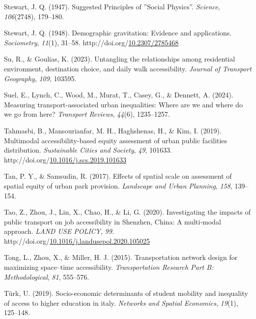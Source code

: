 \documentclass[
11pt, %
oneside, %
english, %
singlespacing, %
]{macthesis} %
\newlength{\cslhangindent}
\newenvironment{CSLReferences}[2] %
{\begin{list}{}{%
	\setlength{\itemindent}{0pt}
	\setlength{\leftmargin}{0pt}
	\setlength{\parsep}{0pt}
	\ifodd #1
	\setlength{\leftmargin}{\cslhangindent}
	\setlength{\itemindent}{-1\cslhangindent}
	\fi
	\setlength{\itemsep}{#2\baselineskip}}}
{\end{list}}
\begin{document}
\begin{CSLReferences}{1}{0}
Stewart, J. Q. (1947). Suggested {Principles} of ''{Social} {Physics}''. \emph{Science}, \emph{106}(2748), 179--180.

Stewart, J. Q. (1948). Demographic gravitation: Evidence and applications. \emph{Sociometry}, \emph{11}(1), 31--58. http://doi.org/\href{https://doi.org/10.2307/2785468}{10.2307/2785468}

Su, R., \& Goulias, K. (2023). Untangling the relationships among residential environment, destination choice, and daily walk accessibility. \emph{Journal of Transport Geography}, \emph{109}, 103595.

Suel, E., Lynch, C., Wood, M., Murat, T., Casey, G., \& Dennett, A. (2024). Measuring transport-associated urban inequalities: Where are we and where do we go from here? \emph{Transport Reviews}, \emph{44}(6), 1235--1257.

Tahmasbi, B., Mansourianfar, M. H., Haghshenas, H., \& Kim, I. (2019). Multimodal accessibility-based equity assessment of urban public facilities distribution. \emph{Sustainable Cities and Society}, \emph{49}, 101633. http://doi.org/\href{https://doi.org/10.1016/j.scs.2019.101633}{10.1016/j.scs.2019.101633}

Tan, P. Y., \& Samsudin, R. (2017). Effects of spatial scale on assessment of spatial equity of urban park provision. \emph{Landscape and Urban Planning}, \emph{158}, 139--154.

Tao, Z., Zhou, J., Lin, X., Chao, H., \& Li, G. (2020). Investigating the impacts of public transport on job accessibility in {Shenzhen}, {China}: A multi-modal approach. \emph{LAND USE POLICY}, \emph{99}. http://doi.org/\href{https://doi.org/10.1016/j.landusepol.2020.105025}{10.1016/j.landusepol.2020.105025}

Tong, L., Zhou, X., \& Miller, H. J. (2015). Transportation network design for maximizing space--time accessibility. \emph{Transportation Research Part B: Methodological}, \emph{81}, 555--576.

Türk, U. (2019). Socio-economic determinants of student mobility and inequality of access to higher education in italy. \emph{Networks and Spatial Economics}, \emph{19}(1), 125--148.


\end{CSLReferences}
\end{document}

